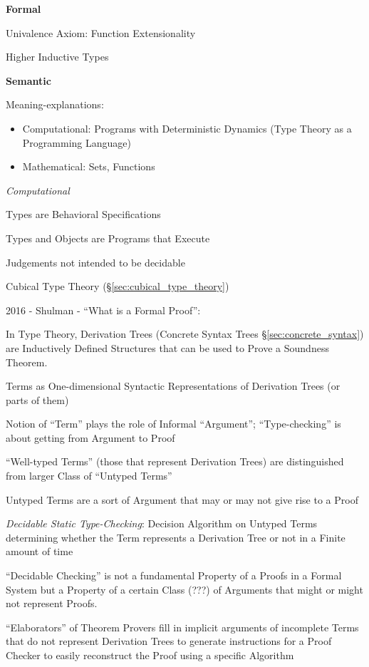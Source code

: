 
\textbf{Formal}

Univalence Axiom: Function Extensionality

Higher Inductive Types


\textbf{Semantic}

Meaning-explanations:
\begin{itemize}
  \item Computational: Programs with Deterministic Dynamics (Type
    Theory as a Programming Language)
  \item Mathematical: Sets, Functions
\end{itemize}

\emph{Computational}

Types are Behavioral Specifications

Types and Objects are Programs that Execute

Judgements not intended to be decidable

Cubical Type Theory (\S\ref{sec:cubical_type_theory})


\asterism


2016 - Shulman - ``What is a Formal Proof'': %

In Type Theory, Derivation Trees (Concrete Syntax Trees
\S\ref{sec:concrete_syntax}) are Inductively Defined Structures that
can be used to Prove a Soundness Theorem.

Terms as One-dimensional Syntactic Representations of Derivation Trees
(or parts of them)

Notion of ``Term'' plays the role of Informal ``Argument'';
``Type-checking'' is about getting from Argument to Proof

``Well-typed Terms'' (those that represent Derivation Trees) are
distinguished from larger Class of ``Untyped Terms''

Untyped Terms are a sort of Argument that may or may not give rise to
a Proof

\emph{Decidable Static Type-Checking}: Decision Algorithm on Untyped
Terms determining whether the Term represents a Derivation Tree or not
in a Finite amount of time

``Decidable Checking'' is not a fundamental Property of a Proofs in a
Formal System but a Property of a certain Class (???) of Arguments
that might or might not represent Proofs.

``Elaborators'' of Theorem Provers fill in implicit arguments of
incomplete Terms that do not represent Derivation Trees to generate
instructions for a Proof Checker to easily reconstruct the Proof using
a specific Algorithm



